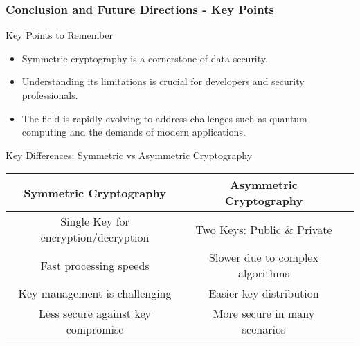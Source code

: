 \documentclass{beamer}
\begin{document}
\begin{frame}[fragile]
    \frametitle{Conclusion and Future Directions - Key Points}
    \begin{block}{Key Points to Remember}
        \begin{itemize}
            \item Symmetric cryptography is a cornerstone of data security.
            \item Understanding its limitations is crucial for developers and security professionals.
            \item The field is rapidly evolving to address challenges such as quantum computing and the demands of modern applications.
        \end{itemize}
    \end{block}

    \begin{block}{Key Differences: Symmetric vs Asymmetric Cryptography}
        \begin{center}
            \begin{tabular}{|c|c|c|}
                \hline
                \textbf{Symmetric Cryptography} & \textbf{Asymmetric Cryptography} \\ \hline
                Single Key for encryption/decryption & Two Keys: Public \& Private \\ \hline
                Fast processing speeds & Slower due to complex algorithms \\ \hline
                Key management is challenging & Easier key distribution \\ \hline
                Less secure against key compromise & More secure in many scenarios \\ \hline
            \end{tabular}
        \end{center}
    \end{block}
\end{frame}
\end{document}
